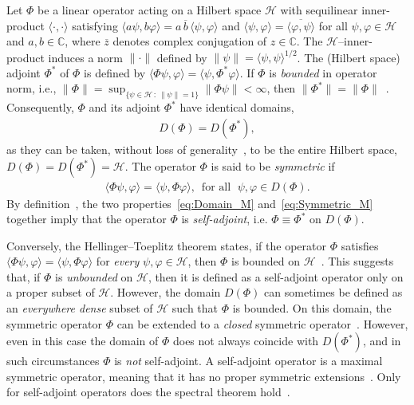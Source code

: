 \documentclass[leqno,onefignum,onetabnum]{siamltex1213}
\newcommand{\Hs}{\mathscr{H}}
\begin{document}
Let $\Phi$ be a linear operator acting on a Hilbert space $\Hs$ with
sequilinear inner-product $\langle\cdot,\cdot\rangle$ satisfying
$\langle a\psi,b\varphi\rangle=a\,\overline{b}\,\langle\psi,\varphi\rangle$ and $\langle\psi,\varphi\rangle=\overline{\langle\varphi,\psi\rangle}$ for all
$\psi,\varphi\in\Hs$ and $a,b\in\mathbb{C}$, where $\overline{z}$ denotes complex
conjugation of $z\in\mathbb{C}$. The $\Hs$--inner-product induces a norm $\|\cdot\|$
defined by $\|\psi\|=\langle\psi,\psi\rangle^{1/2}$. The (Hilbert space) adjoint $\Phi^*$ of $\Phi$
is defined by $\langle\Phi\psi,\varphi\rangle=\langle\psi,\Phi^*\varphi\rangle$. If $\Phi$ is \emph{bounded}
in operator norm,
i.e., $\|\Phi\|=\sup_{\{\psi\in\Hs \,:\, \|\psi\|=1\}}\|\Phi\psi\|<\infty$, then
$\|\Phi^*\|=\|\Phi\|$~\cite{Reed-1980}. Consequently, $\Phi$ and its adjoint $\Phi^*$
have identical domains,          
%
\begin{align}\label{eq:Domain_M}
  D(\Phi)=D(\Phi^*),
\end{align}
%
as they can be taken, without loss of
generality~\cite{Stakgold:BVP:2000}, to be the entire Hilbert space,
$D(\Phi)=D(\Phi^*)=\Hs$. The operator $\Phi$ is said to be \emph{symmetric}
if~\cite{Reed-1980}     
% 
\begin{align}\label{eq:Symmetric_M}
  \langle\Phi\psi,\varphi\rangle=\langle\psi,\Phi\varphi\rangle,
  \, \text{ for all } \; \psi,\varphi\in D(\Phi).
\end{align}
%
By definition~\cite{Reed-1980,Stone:64}, the two
properties~\eqref{eq:Domain_M} and~\eqref{eq:Symmetric_M} together
imply that the operator $\Phi$ is \emph{self-adjoint}, i.e. $\Phi\equiv\Phi^*$
on $D(\Phi)$. 





Conversely, the Hellinger--Toeplitz theorem states, if the operator
$\Phi$ satisfies $\langle\Phi\psi,\varphi\rangle=\langle\psi,\Phi\varphi\rangle$ for \emph{every} $\psi,\varphi\in\Hs$, then
$\Phi$ is bounded on $\Hs$~\cite{Reed-1980}. This suggests that, if $\Phi$
is \emph{unbounded} on $\Hs$, then it is defined as a self-adjoint
operator only on a proper subset of $\Hs$. However, the domain $D(\Phi)$
can sometimes be defined as an \emph{everywhere dense} subset of $\Hs$
such that $\Phi$ is bounded. On this domain, the symmetric
operator $\Phi$ can be extended to a \emph{closed} symmetric
operator~\cite{Reed-1980,Stone:64}. However, even in this case the
domain of $\Phi$ does not always coincide with $D(\Phi^*)$, and in such
circumstances $\Phi$ is \emph{not} self-adjoint. A self-adjoint operator
is a maximal symmetric operator, meaning that it has  no proper symmetric
extensions~\cite{Stone:64}. Only for self-adjoint operators does the
spectral theorem hold~\cite{Reed-1980,Stone:64}.  
\end{document}
